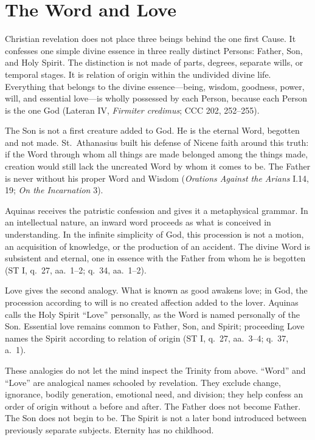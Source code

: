 \section{The Word and Love}

Christian revelation does not place three beings behind the one first Cause. It confesses one simple divine essence in three really distinct Persons: Father, Son, and Holy Spirit. The distinction is not made of parts, degrees, separate wills, or temporal stages. It is relation of origin within the undivided divine life. Everything that belongs to the divine essence---being, wisdom, goodness, power, will, and essential love---is wholly possessed by each Person, because each Person is the one God (Lateran IV, \emph{Firmiter credimus}; CCC 202, 252--255).

The Son is not a first creature added to God. He is the eternal Word, begotten and not made. St.~Athanasius built his defense of Nicene faith around this truth: if the Word through whom all things are made belonged among the things made, creation would still lack the uncreated Word by whom it comes to be. The Father is never without his proper Word and Wisdom (\emph{Orations Against the Arians} I.14, 19; \emph{On the Incarnation} 3).

Aquinas receives the patristic confession and gives it a metaphysical grammar. In an intellectual nature, an inward word proceeds as what is conceived in understanding. In the infinite simplicity of God, this procession is not a motion, an acquisition of knowledge, or the production of an accident. The divine Word is subsistent and eternal, one in essence with the Father from whom he is begotten (ST I, q.~27, aa.~1--2; q.~34, aa.~1--2).

Love gives the second analogy. What is known as good awakens love; in God, the procession according to will is no created affection added to the lover. Aquinas calls the Holy Spirit ``Love'' personally, as the Word is named personally of the Son. Essential love remains common to Father, Son, and Spirit; proceeding Love names the Spirit according to relation of origin (ST I, q.~27, aa.~3--4; q.~37, a.~1).

These analogies do not let the mind inspect the Trinity from above. ``Word'' and ``Love'' are analogical names schooled by revelation. They exclude change, ignorance, bodily generation, emotional need, and division; they help confess an order of origin without a before and after. The Father does not become Father. The Son does not begin to be. The Spirit is not a later bond introduced between previously separate subjects. Eternity has no childhood.

